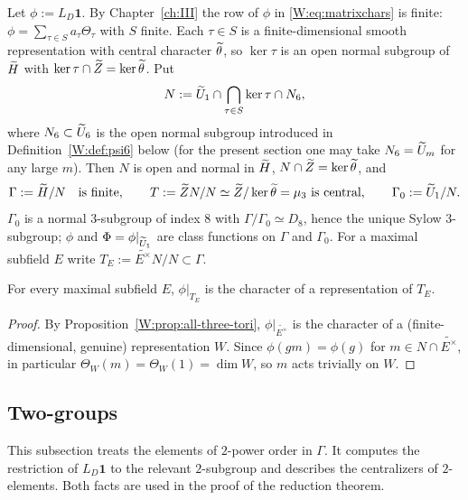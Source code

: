 Let $\phi:=L_D\mathbf1$.  By Chapter~\ref{ch:III} the row of $\phi$ in
\eqref{W:eq:matrixchars} is finite: $\phi=\sum_{\tau\in S}a_\tau\Theta_\tau$
with $S$ finite.  Each $\tau\in S$ is a finite-dimensional smooth
representation with central character $\widetilde\theta$, so $\ker\tau$ is an open
normal subgroup of $\widetilde H$ with $\ker\tau\cap\widetilde Z=\ker\widetilde\theta$.  Put
\begin{equation}\label{W:eq:N}
 N:=\widetilde U_1\cap\bigcap_{\tau\in S}\ker\tau\cap N_6 ,
\end{equation}
where $N_6\subset\widetilde U_6$ is the open normal subgroup introduced in
Definition~\ref{W:def:psi6} below (for the present section one may take
$N_6=\widetilde U_m$ for any large $m$).  Then $N$ is open and normal in $\widetilde H$,
$N\cap\widetilde Z=\ker\widetilde\theta$, and
\[
 \Gamma:=\widetilde H/N\quad\text{is finite},\qquad
 T:=\widetilde Z N/N\simeq\widetilde Z/\ker\widetilde\theta=\mu_3\ \text{is central},\qquad
 \Gamma_0:=\widetilde U_1/N .
\]
$\Gamma_0$ is a normal $3$-subgroup of index $8$ with $\Gamma/\Gamma_0\simeq D_8$,
hence the unique Sylow $3$-subgroup; $\phi$ and $\Phi=\phi|_{\widetilde U_1}$ are
class functions on $\Gamma$ and $\Gamma_0$.  For a maximal subfield
$E$ write $T_E:=\widetilde{E^\times}N/N\subset\Gamma$.

\begin{lemma}\label{W:lem:toral-descent}
For every maximal subfield $E$, $\phi|_{T_E}$ is the character of a
representation of $T_E$.
\end{lemma}
\begin{proof}
By Proposition~\ref{W:prop:all-three-tori}, $\phi|_{\widetilde{E^\times}}$ is
the character of a (finite-dimensional, genuine) representation $W$.
Since $\phi(gm)=\phi(g)$ for $m\in N\cap\widetilde{E^\times}$, in
particular $\Theta_W(m)=\Theta_W(1)=\dim W$, so $m$ acts trivially on $W$.
\end{proof}

\subsection{Two-groups}
This subsection treats the elements of $2$-power order in $\Gamma$. It computes the restriction of $L_D\mathbf1$ to the relevant $2$-subgroup and describes the centralizers of $2$-elements. Both facts are used in the proof of the reduction theorem.


